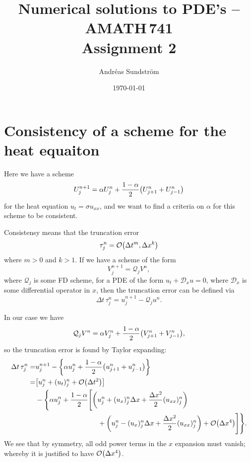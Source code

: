 \documentclass[11pt,letter, swedish, english
]{article}
\newcommand{\Dx}{\ensuremath{\Delta{x}}}
\newcommand{\Dt}{\ensuremath{\Delta{t}}}
\begin{document}

\title{Numerical solutions to PDE's -- AMATH\,741 \\
Assignment 2}
\author{Andréas Sundström}
\date{\today}

\maketitle



\section{Consistency of a scheme for the heat equaiton}
Here we have a scheme
\begin{equation}
U_j^{n+1}=\alpha U_j^n+\frac{1-\alpha}{2}\qty(U_{j+1}^n+U_{j-1}^n)
\end{equation}
for the heat equation $u_t=\sigma u_{xx}$, and we want to find a
criteria on $\alpha$ for this scheme to be consistent.

Consistensy means that the truncation error
\begin{equation}
\tau_j^n=\order{\Dt^m, \Dx^k}
\end{equation}
where $m>0$ and $k>1$. 
If we have a scheme of the form
\begin{equation}
V^{n+1}_j=\mathcal{Q}_jV^n,
\end{equation}
where $\mathcal{Q}_j$ is some FD scheme, for a PDE of the form
$u_t+\mathcal{D}_xu=0$, where $\mathcal{D}_x$ is some differential
operator in $x$, then the truncation error can be defined via
\begin{equation}
\Dt\,\tau_j^{n}=u_j^{n+1}-\mathcal{Q}_ju^n.
\end{equation}

In our case we have
\begin{equation}
\mathcal{Q}_jV^n=\alpha V_j^n+\frac{1-\alpha}{2}\qty(V_{j+1}^n+V_{j-1}^n),
\end{equation}
so the truncation error is found by Taylor expanding:
\begin{equation}
\begin{aligned}
\Dt\,\tau_j^n=&u_j^{n+1}
-\qty{\alpha u_j^n+\frac{1-\alpha}{2}\qty(u_{j+1}^n+u_{j-1}^n)}\\
=& \qty[u_j^n+(u_t)_j^n+\order{\Dt^2}]\\
&-\Bigg\{\alpha u_j^n+\frac{1-\alpha}{2}
\Bigg[\qty(u_j^n+(u_x)_j^n\Dx+\frac{\Dx^2}{2}(u_{xx})_j^n)\\
&\hspace{90pt}+\qty(u_j^n-(u_x)_j^n\Dx+\frac{\Dx^2}{2}(u_{xx})_j^n)
+\order{\Dx^4}\Bigg]\Bigg\}.
\end{aligned}
\end{equation}
We see that by symmetry, all odd power terms in the $x$ expansion must
vanish; whereby  it is justified to have $\order{\Dx^4}$. 
\end{document}
